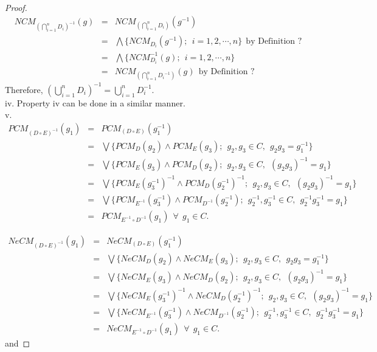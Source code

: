 \documentclass[12pt,letterpaper]{amsart}
\newcommand{\dis}{\displaystyle}
\theoremstyle{plain}
\theoremstyle{definition}
\numberwithin{equation}{section}
\begin{document}
\begin{proof}
\begin{eqnarray*}
NCM_{\dis \left(\bigcap^n_{i = 1} D_i\right)^{-1}}(g) & = & NCM_{\dis \left(\bigcap^n_{i = 1} D_i\right)}(g^{-1})\\
& = & \bigwedge \lbrace  NCM_{D_i}(g^{-1});~~ i = 1, 2, \cdots, n \rbrace~~ \text{by~Definition ?} \\
& = & \bigwedge \lbrace  NCM_{D_i}^{-1}(g);~~ i = 1, 2, \cdots, n \rbrace\\
& = & NCM_{\dis \left(\bigcap^n_{i = 1} {D_i}^{-1}\right)}(g)~~ \text{by~Definition ?}
\end{eqnarray*}
Therefore, $ \dis \left(\bigcup^n_{i = 1} D_i\right)^{-1} = \bigcup^n_{i = 1} D_i^{-1}.$\\

iv. Property iv can be done in a similar manner.\\

v.
\begin{eqnarray*}
PCM_{ (D \circ E)^{-1}}(g_1) & = & PCM_{ (D \circ E)}(g^{-1}_1)\\
& = & \bigvee \lbrace  PCM_{D}(g_2) \wedge PCM_{E}(g_3);~~ g_2, g_3 \in C,~~ g_2g_3 = g_1^{-1} \rbrace \\
& = & \bigvee \lbrace  PCM_{E}(g_3) \wedge PCM_{D}(g_2);~~ g_2, g_3 \in C,~~ (g_2g_3)^{-1} = g_1 \rbrace\\
& = & \bigvee \lbrace  PCM_{E}(g^{-1}_3)^{-1} \wedge PCM_{D}(g^{-1}_2)^{-1};~~ g_2, g_3 \in C,~~ (g_2g_3)^{-1} = g_1 \rbrace\\
& = & \bigvee \lbrace  PCM_{E^{-1}}(g^{-1}_3) \wedge PCM_{D^{-1}}(g^{-1}_2);~~ g^{-1}_2, g^{-1}_3 \in C,~~ g^{-1}_2g^{-1}_3 = g_1 \rbrace\\
& = & PCM_{E^{-1} \circ D^{-1}}(g_1)~~ \forall~~ g_1 \in C.
\end{eqnarray*}

\begin{eqnarray*}
NeCM_{ (D \circ E)^{-1}}(g_1) & = & NeCM_{ (D \circ E)}(g^{-1}_1)\\
& = & \bigvee \lbrace  NeCM_{D}(g_2) \wedge NeCM_{E}(g_3);~~ g_2, g_3 \in C,~~ g_2g_3 = g_1^{-1} \rbrace \\
& = & \bigvee \lbrace  NeCM_{E}(g_3) \wedge NeCM_{D}(g_2);~~ g_2, g_3 \in C,~~ (g_2g_3)^{-1} = g_1 \rbrace\\
& = & \bigvee \lbrace  NeCM_{E}(g^{-1}_3)^{-1} \wedge NeCM_{D}(g^{-1}_2)^{-1};~~ g_2, g_3 \in C,~~ (g_2g_3)^{-1} = g_1 \rbrace\\
& = & \bigvee \lbrace  NeCM_{E^{-1}}(g^{-1}_3) \wedge NeCM_{D^{-1}}(g^{-1}_2);~~ g^{-1}_2, g^{-1}_3 \in C,~~ g^{-1}_2g^{-1}_3 = g_1 \rbrace\\
& = & NeCM_{E^{-1} \circ D^{-1}}(g_1)~~ \forall~~ g_1 \in C.
\end{eqnarray*}
and 


\end{proof}
\end{document}
